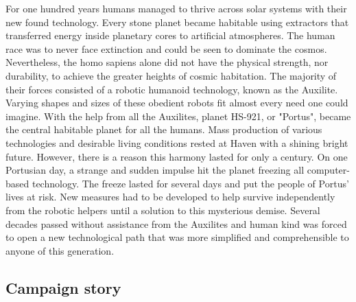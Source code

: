\documentclass[../Main.tex]{subfiles}
\begin{document}
For one hundred years humans managed to thrive across solar systems with their new found technology. Every stone planet became habitable using extractors that transferred energy inside planetary cores to artificial atmospheres. The human race was to never face extinction and could be seen to dominate the cosmos. Nevertheless, the homo sapiens alone did not have the physical strength, nor durability, to achieve the greater heights of cosmic habitation. The majority of their forces consisted of a robotic humanoid technology, known as the Auxilite. Varying shapes and sizes of these obedient robots fit almost every need one could imagine. With the help from all the Auxilites, planet HS-921, or "Portus", became the central habitable planet for all the humans. Mass production of various technologies and desirable living conditions rested at Haven with a shining bright future. However, there is a reason this harmony lasted for only a century. On one Portusian day, a strange and sudden impulse hit the planet freezing all computer-based technology. The freeze lasted for several days and put the people of Portus' lives at risk. New measures had to be developed to help survive independently from the robotic helpers until a solution to this mysterious demise. Several decades passed without assistance from the Auxilites and human kind was forced to open a new technological path that was more simplified and comprehensible to anyone of this generation. 

\subsection{Campaign story}
\end{document}
